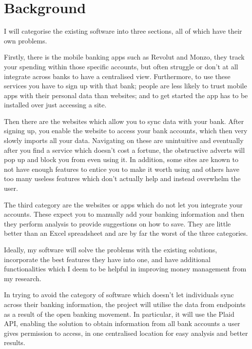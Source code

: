 \section{Background}
I will categorise the existing software into three sections, all of which have their own problems. 

Firstly, there is the mobile banking apps such as Revolut and Monzo, they track your spending within those specific accounts, but often struggle or don't at all integrate across banks to have a centralised view. Furthermore, to use these services you have to sign up with that bank; people are less likely to trust mobile apps with their personal data than websites; and to get started the app has to be installed over just accessing a site.

Then there are the websites which allow you to sync data with your bank. After signing up, you enable the website to access your bank accounts, which then very slowly imports all your data. Navigating on these are unintuitive and eventually after you find a service which doesn't cost a fortune, the obstructive adverts will pop up and block you from even using it. In addition, some sites are known to not have enough features to entice you to make it worth using and others have too many useless features which don't actually help and instead overwhelm the user.

The third category are the websites or apps which do not let you integrate your accounts. These expect you to manually add your banking information and then they perform analysis to provide suggestions on how to save. They are little better than an Excel spreadsheet and are by far the worst of the three categories.

Ideally, my software will solve the problems with the existing solutions, incorporate the best features they have into one, and have additional functionalities which I deem to be helpful in improving money management from my research.

In trying to avoid the category of software which doesn't let individuals sync across their banking information, the project will utilise the data from endpoints as a result of the open banking movement. In particular, it will use the Plaid API, enabling the solution to obtain information from all bank accounts a user gives permission to access, in one centralised location for easy analysis and better results.